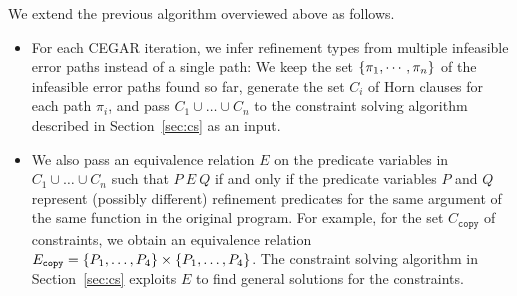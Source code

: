 We extend the previous algorithm overviewed above as follows.
\begin{itemize}
\item For each CEGAR iteration, we infer refinement types from multiple 
infeasible error paths instead of a single path:  We keep the set 
\(\{{\pi_1,\cdots,\pi_n}\}\) of the infeasible error paths found so far, 
generate the set \(C_i\) of Horn clauses for each path \(\pi_i\), and 
pass \(C_1 \cup \dots \cup C_n\) to the constraint solving algorithm 
described in Section~\ref{sec:cs} as an input.  %
\item We also pass an equivalence relation \(E\) on the predicate 
variables in \(C_1 \cup \dots \cup C_n\) such that \(P\ E\ Q\) if and 
only if the predicate variables \(P\) and \(Q\) represent (possibly 
different) refinement predicates for the same argument of the same 
function in the original program.  For example, for the set 
\(C_{\texttt{copy}}\) of constraints, we obtain an equivalence relation 
\(E_{\texttt{copy}}=\{{P_1,\dots,P_4}\} \times \{{P_1,\dots,P_4}\}\).  
The constraint solving algorithm in Section~\ref{sec:cs} exploits \(E\) 
to find general solutions for the constraints.
\end{itemize}




